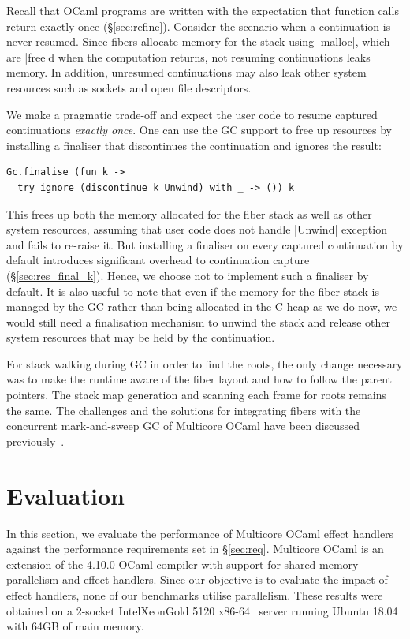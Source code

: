\documentclass[sigplan,screen]{acmart}
\begin{document}
Recall that OCaml programs are written with the expectation that function calls
return exactly once (\S\ref{sec:refine}). Consider the scenario when a
continuation is never resumed. Since fibers allocate memory for the stack using
|malloc|, which are |free|d when the computation returns, not resuming
continuations leaks memory. In addition, unresumed continuations may also leak
other system resources such as sockets and open file descriptors.

We make a pragmatic trade-off and expect the user code to resume captured
continuations \emph{exactly once}. One can use the GC support to free up
resources by installing a finaliser that discontinues the continuation and
ignores the result:

\begin{lstlisting}
Gc.finalise (fun k ->
  try ignore (discontinue k Unwind) with _ -> ()) k
\end{lstlisting}

This frees up both the memory allocated for the fiber stack as well as other
system resources, assuming that user code does not handle |Unwind| exception
and fails to re-raise it. But installing a finaliser on every captured
continuation by default introduces significant overhead to continuation capture
(\S\ref{sec:res_final_k}). Hence, we choose not to implement such a finaliser by
default. It is also useful to note that even if the memory for the fiber stack
is managed by the GC rather than being allocated in the C heap as we do now, we
would still need a finalisation mechanism to unwind the stack and release other
system resources that may be held by the continuation.

For stack walking during GC in order to find the roots, the only change
necessary was to make the runtime aware of the fiber layout and how to follow
the parent pointers. The stack map generation and scanning each frame for roots
remains the same. The challenges and the solutions for integrating fibers with
the concurrent mark-and-sweep GC of Multicore OCaml have been discussed
previously~\cite{Sivaramakrishnan20}.

\section{Evaluation}
\label{sec:eval}

In this section, we evaluate the performance of Multicore OCaml effect handlers
against the performance requirements set in \S\ref{sec:req}. Multicore OCaml is
an extension of the 4.10.0 OCaml compiler with support for shared memory
parallelism and effect handlers. Since our objective is to evaluate the impact
of effect handlers, none of our benchmarks utilise parallelism. These results
were obtained on a 2-socket Intel\textregistered Xeon\textregistered Gold 5120
x86-64~\cite{IntelXeonGold5120Spec} server running Ubuntu 18.04 with 64GB of
main memory.
\end{document}
